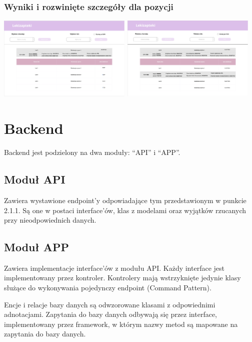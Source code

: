 \documentclass{article}
\begin{document}
      \subsubsection{Wyniki i rozwinięte szczegóły dla pozycji}
      \includegraphics[width=6.4cm, height=4cm]{lekizapteki-leki-identyczne}
      \includegraphics[width=6.4cm, height=4cm]{lekizapteki-leki-identyczne-rozwiniete}

  \section{Backend}
  Backend jest podzielony na dwa moduły: ``API'' i ``APP''.

    \subsection{Moduł API}
    Zawiera wystawione endpoint'y odpowiadające tym przedstawionym w punkcie 2.1.1.
    Są one w postaci interface'ów, klas z modelami oraz wyjątków rzucanych przy nieodpowiednich danych.

    \subsection{Moduł APP}
    Zawiera implementacje interface'ów z modułu API.
    Każdy interface jest implementowany przez kontroler.
    Kontrolery mają wstrzyknięte jedynie klasy służące do wykonywania pojedynczy endpoint (Command Pattern).

    Encje i relacje bazy danych są odwzorowane klasami z odpowiednimi adnotacjami.
    Zapytania do bazy danych odbywają się przez interface, implementowany przez framework,
    w którym nazwy metod są mapowane na zapytania do bazy danych.
\end{document}

